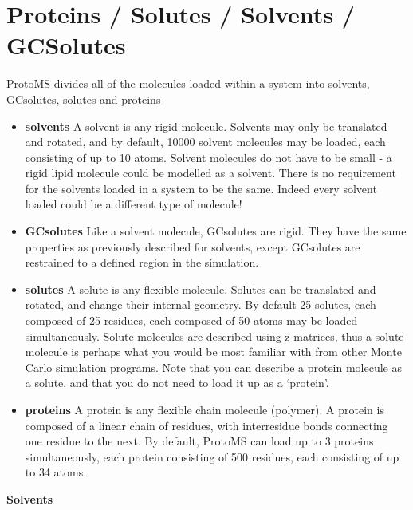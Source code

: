 \documentclass[letterpaper,10pt,english]{sphinxmanual}
\begin{document}
\section{Proteins / Solutes / Solvents / GCSolutes}
\label{protoms:proteins-solutes-solvents-gcsolutes}
ProtoMS divides all of the molecules loaded within a system into solvents, GCsolutes, solutes and proteins
\begin{itemize}
\item {} 
\textbf{solvents}  A solvent is any rigid molecule. Solvents may only be translated and rotated, and by default, 10000 solvent molecules may be loaded, each consisting of up to 10 atoms. Solvent molecules do not have to be small - a rigid lipid molecule could be modelled as a solvent. There is no requirement for the solvents loaded in a system to be the same. Indeed every solvent loaded could be a different type of molecule!

\item {} 
\textbf{GCsolutes} Like a solvent molecule, GCsolutes are rigid. They have the same properties as previously described for solvents, except GCsolutes are restrained to a defined region in the simulation.

\item {} 
\textbf{solutes} A solute is any flexible molecule. Solutes can be translated and rotated, and change their internal geometry. By default 25 solutes, each composed of 25 residues, each composed of 50 atoms may be loaded simultaneously. Solute molecules are described using z-matrices, thus a solute molecule is perhaps what you would be most familiar with from other Monte Carlo simulation programs. Note that you can describe a protein molecule as a solute, and that you do not need to load it up as a ‘protein’.

\item {} 
\textbf{proteins} A protein is any flexible chain molecule (polymer). A protein is composed of a linear chain of residues, with interresidue bonds connecting one residue to the next. By default, ProtoMS can load up to 3 proteins simultaneously, each protein consisting of 500 residues, each consisting of up to 34 atoms.

\end{itemize}

\textbf{Solvents}
\end{document}

